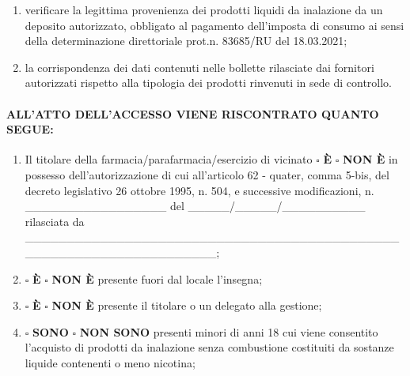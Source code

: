 \documentclass[12pt]{article}
\begin{document}
\begin{enumerate}
    \item verificare la legittima provenienza dei prodotti liquidi da inalazione da un deposito autorizzato, obbligato al pagamento dell’imposta di consumo ai sensi della determinazione direttoriale prot.n. 83685/RU del 18.03.2021;
    \item la corrispondenza dei dati contenuti nelle bollette rilasciate dai fornitori autorizzati rispetto alla tipologia dei prodotti rinvenuti in sede di controllo.
\end{enumerate}

\paragraph{ALL'ATTO DELL'ACCESSO VIENE RISCONTRATO QUANTO SEGUE:}

\begin{enumerate}
    \item Il titolare della farmacia/parafarmacia/esercizio di vicinato \begin{math}\square\end{math} \textbf{È} \begin{math}\square\end{math} \textbf{NON È} in possesso dell’autorizzazione di cui all’articolo 62 - quater, comma 5-bis, del decreto legislativo 26 ottobre 1995, n. 504, e successive modificazioni, n. \_\_\_\_\_\_\_\_\_\_\_\_\_\_\_\_\_ del \_\_\_\_\_/\_\_\_\_\_/\_\_\_\_\_\_\_\_\_\_ rilasciata da \_\_\_\_\_\_\_\_\_\_\_\_\_\_\_\_\_\_\_\_\_\_\_\_\_\_\_\_\_\_\_\_\_\_\_\_\_\_\_\_\_\_\_\_\_\_\_\_\_\_\_\_\_\_\_\_\_\_\_\_\_\_\_\_\_\_\_\_;
    \item \begin{math}\square\end{math} \textbf{È} \begin{math}\square\end{math} \textbf{NON È} presente fuori dal locale l'insegna;
    \item \begin{math}\square\end{math} \textbf{È} \begin{math}\square\end{math} \textbf{NON È} presente il titolare o un delegato alla gestione;
    \item \begin{math}\square\end{math} \textbf{SONO} \begin{math}\square\end{math} \textbf{NON SONO} presenti minori di anni 18 cui viene consentito l’acquisto di prodotti da inalazione senza combustione costituiti da sostanze liquide contenenti o meno nicotina;

\end{enumerate}
\end{document}
